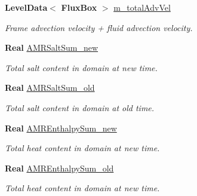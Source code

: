 \begin{DoxyCompactItemize}
\textbf{ Level\+Data}$<$ \textbf{ Flux\+Box} $>$ \hyperlink{class_a_m_r_level_mushy_layer_a6bba1599c6385bfc52087d65d83e2485}{m\+\_\+total\+Adv\+Vel}
\begin{DoxyCompactList}\small\item\em Frame advection velocity + fluid advection velocity. \end{DoxyCompactList}\item 
\mbox{\label{class_a_m_r_level_mushy_layer_a40949c8df12b362facb7aa3f1d879cf6}} 
\textbf{ Real} \hyperlink{class_a_m_r_level_mushy_layer_a40949c8df12b362facb7aa3f1d879cf6}{A\+M\+R\+Salt\+Sum\+\_\+new}
\begin{DoxyCompactList}\small\item\em Total salt content in domain at new time. \end{DoxyCompactList}\item 
\mbox{\label{class_a_m_r_level_mushy_layer_a9e9671d353d9bdf3e9be0bdbb06bc2be}} 
\textbf{ Real} \hyperlink{class_a_m_r_level_mushy_layer_a9e9671d353d9bdf3e9be0bdbb06bc2be}{A\+M\+R\+Salt\+Sum\+\_\+old}
\begin{DoxyCompactList}\small\item\em Total salt content in domain at old time. \end{DoxyCompactList}\item 
\mbox{\label{class_a_m_r_level_mushy_layer_a2826cb43a2acbc06d05ea5625aed4263}} 
\textbf{ Real} \hyperlink{class_a_m_r_level_mushy_layer_a2826cb43a2acbc06d05ea5625aed4263}{A\+M\+R\+Enthalpy\+Sum\+\_\+new}
\begin{DoxyCompactList}\small\item\em Total heat content in domain at new time. \end{DoxyCompactList}\item 
\mbox{\label{class_a_m_r_level_mushy_layer_abc6821ef9d09fddf0cd3e55fc0bb349d}} 
\textbf{ Real} \hyperlink{class_a_m_r_level_mushy_layer_abc6821ef9d09fddf0cd3e55fc0bb349d}{A\+M\+R\+Enthalpy\+Sum\+\_\+old}
\begin{DoxyCompactList}\small\item\em Total heat content in domain at new time. \end{DoxyCompactList}\item 

\end{DoxyCompactItemize}
